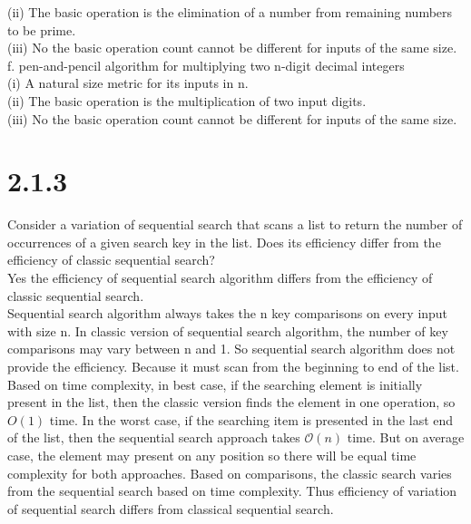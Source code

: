 \documentclass[8pt, letterpaper]{article}
\begin{document}
    \indent(ii) The basic operation is the elimination of a number from remaining numbers to be prime.\\
    \indent(iii) No the basic operation count cannot be different for inputs of the same size. \\
f. pen-and-pencil algorithm for multiplying two n-digit decimal integers\\
    \indent(i) A natural size metric for its inputs in n. \\
    \indent(ii) The basic operation is the multiplication of two input digits. \\
    \indent(iii) No the basic operation count cannot be different for inputs of the same size. 

\section{2.1.3}
Consider a variation of sequential search that scans a list to return the number
of occurrences of a given search key in the list. Does its efficiency differ from
the efficiency of classic sequential search? \\
    \indent Yes the efficiency of sequential search algorithm differs from the efficiency of classic sequential search. \\ 
    \indent Sequential search algorithm always takes the n key comparisons on every input with size n. In classic version of sequential search algorithm, the number of key comparisons may vary between n and 1. So sequential search algorithm does not provide the efficiency. Because it must scan from the beginning to end of the list. 
    Based on time complexity, in best case, if the searching element is initially present in the list, then the classic version finds the element in one operation, so $O(1)$ time. In the worst case, if the searching item is presented in the last end of the list, then the sequential search approach takes $\mathcal{O}(n)$ time.
    But on average case, the element may present on any position so there will be equal time complexity for both approaches. Based on comparisons, the classic search varies from the sequential search based on time complexity. Thus efficiency of variation of sequential search differs from classical sequential search.
\end{document}
